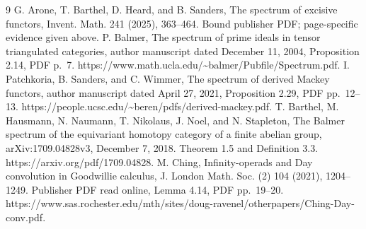 \documentclass[10pt]{article}
\begin{document}
9 G. Arone, T. Barthel, D. Heard, and B. Sanders, The spectrum of excisive functors, Invent. Math. 241 (2025), 363–464. Bound publisher PDF; page-specific evidence given above. P. Balmer, The spectrum of prime ideals in tensor triangulated categories, author manuscript dated December 11, 2004, Proposition 2.14, PDF p. 7. https://www.math.ucla.edu/\textasciitilde{}balmer/Pubfile/Spectrum.pdf. I. Patchkoria, B. Sanders, and C. Wimmer, The spectrum of derived Mackey functors, author manuscript dated April 27, 2021, Proposition 2.29, PDF pp. 12–13. https://people.ucsc.edu/\textasciitilde{}beren/pdfs/derived-mackey.pdf. T. Barthel, M. Hausmann, N. Naumann, T. Nikolaus, J. Noel, and N. Stapleton, The Balmer spectrum of the equivariant homotopy category of a finite abelian group, arXiv:1709.04828v3, December 7, 2018. Theorem 1.5 and Definition 3.3. https://arxiv.org/pdf/1709.04828. M. Ching, Infinity-operads and Day convolution in Goodwillie calculus, J. London Math. Soc. (2) 104 (2021), 1204–1249. Publisher PDF read online, Lemma 4.14, PDF pp. 19–20. https://www.sas.rochester.edu/mth/sites/doug-ravenel/otherpapers/Ching-Day-conv.pdf.\par
\end{document}
